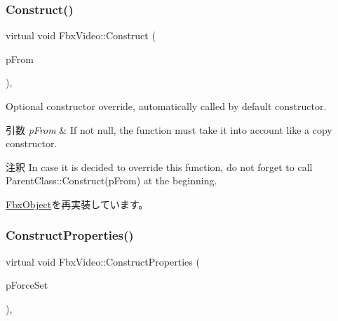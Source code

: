 \mbox{\label{class_fbx_video_a1cd66b3d19e213f62f90d073462e4cce}} 
\subsubsection{\texorpdfstring{Construct()}{Construct()}}
{\footnotesize\ttfamily virtual void Fbx\+Video\+::\+Construct (\begin{DoxyParamCaption}\item[{const \hyperlink{class_fbx_object}{Fbx\+Object} $\ast$}]{p\+From }\end{DoxyParamCaption})\hspace{0.3cm}{\ttfamily [protected]}, {\ttfamily [virtual]}}

Optional constructor override, automatically called by default constructor. 
\begin{DoxyParams}{引数}
{\em p\+From} & If not null, the function must take it into account like a copy constructor. \\
\hline
\end{DoxyParams}
\begin{DoxyRemark}{注釈}
In case it is decided to override this function, do not forget to call Parent\+Class\+::\+Construct(p\+From) at the beginning. 
\end{DoxyRemark}


\hyperlink{class_fbx_object_a313503bc645af3fdceb4a99ef5cea7eb}{Fbx\+Object}を再実装しています。

\mbox{\label{class_fbx_video_a25c6015f2330ec4ff029ac919b1a231c}} 
\subsubsection{\texorpdfstring{Construct\+Properties()}{ConstructProperties()}}
{\footnotesize\ttfamily virtual void Fbx\+Video\+::\+Construct\+Properties (\begin{DoxyParamCaption}\item[{bool}]{p\+Force\+Set }\end{DoxyParamCaption})\hspace{0.3cm}{\ttfamily [protected]}, {\ttfamily [virtual]}}

